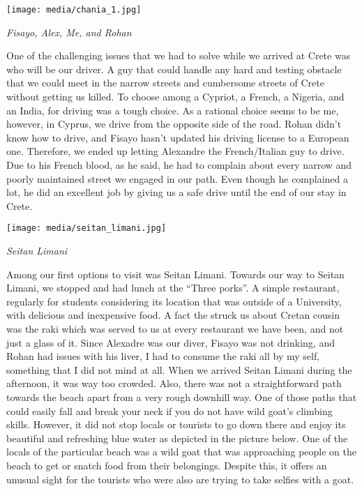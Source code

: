 \documentclass[10pt,a4paper]{article} %
\begin{document}
\begin{multicols}{3}
\begin{center}
	\texttt{[image: media/chania\_1.jpg]}
	\par\textit{Fisayo, Alex, Me, and Rohan}
\end{center}

One of the challenging issues that we had to solve while
we arrived at Crete was who will be our driver.
A guy that could handle any hard and testing obstacle
that we could meet in the narrow streets and cumbersome
streets of Crete without getting us killed. 
To choose among a Cypriot, a French, a Nigeria, and an India,
for driving was a tough choice. 
As a rational choice seems to be me, however, in Cyprus,
we drive from the opposite side of the road. 
Rohan didn't know how to drive, and Fisayo hasn't updated his driving license
to a European one. 
Therefore, we ended up letting Alexandre the French/Italian guy to drive. 
Due to his French blood, as he said, he had to complain about every narrow 
and poorly maintained street we engaged in our path. 
Even though he complained a lot,
he did an excellent job by giving us a safe drive
until the end of our stay in Crete. 

\begin{center}
	\texttt{[image: media/seitan\_limani.jpg]}
	\par\textit{Seitan Limani}
\end{center}

Among our first options to visit was Seitan Limani. 
Towards our way to Seitan Limani, we stopped and had lunch at the 
``Three porks''. 
A simple restaurant, regularly for students considering its location
that was outside of a University, with delicious and inexpensive food. 
A fact the struck us about Cretan cousin was the raki
which was served to us at every restaurant we have been,
and not just a glass of it. 
Since Alexadre was our diver, Fisayo was not drinking,
and Rohan had issues with his liver, I had to consume the raki all by my self,
something that I did not mind at all. 
When we arrived Seitan Limani during the afternoon, it was way too crowded. 
Also, there was not a straightforward path towards the beach
apart from a very rough downhill way. 
One of those paths that could easily fall and break your neck
if you do not have wild goat's climbing skills. 
However, it did not stop locals or tourists to go down there
and enjoy its beautiful and refreshing blue water as depicted in the picture below. 
One of the locals of the particular beach was a wild goat
that was approaching people on the beach to get or snatch food from their belongings. 
Despite this, it offers an unusual sight for the tourists
who were also are trying to take selfies with a goat.   


\end{multicols}
\end{document}
